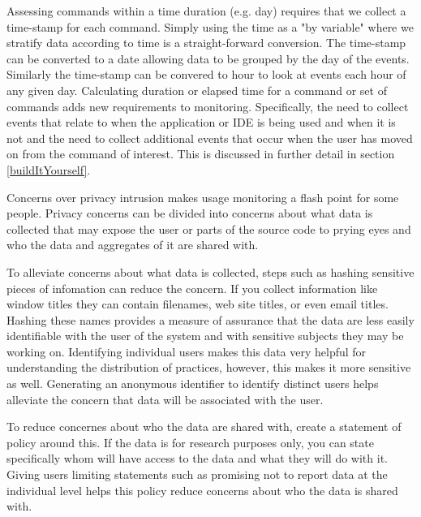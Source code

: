 Assessing commands within a time duration (e.g. day) requires that we collect a time-stamp for each command.  Simply using the time as a "by variable" where we stratify data according to time is a straight-forward conversion.  The time-stamp can be converted to a date allowing data to be grouped by the day of the events.  Similarly the time-stamp can be convered to hour to look at events each hour of any given day.
Calculating duration or elapsed time for a command or set of commands adds new requirements to monitoring.  Specifically, the need to collect events that relate to when the application or IDE is being used and when it is not and the need to collect additional events that occur when the user has moved on from the command of interest.  This is discussed in further detail in section \ref{buildItYourself}.

Concerns over privacy intrusion makes usage monitoring a flash point for some people.  Privacy concerns can be divided into concerns about what data is collected that may expose the user or parts of the source code to prying eyes and who the data and aggregates of it are shared with.  

To alleviate concerns about what data is collected, steps such as hashing sensitive pieces of infomation can reduce the concern. If you collect information like window titles they can contain filenames, web site titles, or even email titles.  Hashing these names provides a measure of assurance that the data are less easily identifiable with the user of the system and with sensitive subjects they may be working on.   Identifying individual users makes this data very helpful for understanding the distribution of practices, however, this makes it more sensitive as well.  Generating an anonymous identifier to identify distinct users helps alleviate the concern that data will be associated with the user.

To reduce concernes about who the data are shared with, create a statement of policy around this.  If the data is for research purposes only, you can state specifically whom will have access to the data and what they will do with it.  Giving users limiting statements such as promising not to report data at the individual level helps this policy reduce concerns about who the data is shared with.


